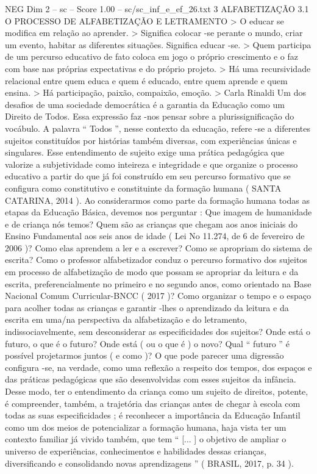 \begin{textsample}{NEG Dim 2 – sc – Score 1.00 – sc/sc\_inf\_e\_ef\_26.txt}  \label{ex:f2_neg_274}
3 ALFABETIZAÇÃO 3.1 O PROCESSO DE ALFABETIZAÇÃO E LETRAMENTO > O educar se modifica em relação ao aprender. > Significa colocar -se perante o mundo, criar um evento, habitar as diferentes situações.
Significa educar -se. > Quem participa de um percurso educativo de fato coloca em jogo o próprio crescimento e o faz com base nas próprias expectativas e do próprio projeto. > Há uma recursividade relacional entre quem educa e quem é educado, entre quem aprende e quem ensina. > Há participação, paixão, compaixão, emoção. > Carla Rinaldi Um dos desafios de uma sociedade democrática é a garantia da Educação como um Direito de Todos.
Essa expressão faz -nos pensar sobre a plurissignificação do vocábulo.
A palavra “ Todos ”, nesse contexto da educação, refere -se a diferentes sujeitos constituídos por histórias também diversas, com experiências únicas e singulares.
Esse entendimento de sujeito exige uma prática pedagógica que valorize a subjetividade como inteireza e integridade e que organize o processo educativo a partir do que já foi construído em seu percurso formativo que se configura como constitutivo e constituinte da formação humana ( SANTA CATARINA, 2014 ).
Ao considerarmos como parte da formação humana todas as etapas da Educação Básica, devemos nos perguntar : Que imagem de humanidade e de criança nós temos?
Quem são as crianças que chegam aos anos iniciais do Ensino Fundamental aos seis anos de idade ( Lei No 11.274, de 6 de fevereiro de 2006 )?
Como elas aprendem a ler e a escrever?
Como se apropriam do sistema de escrita?
Como o professor alfabetizador conduz o percurso formativo dos sujeitos em processo de alfabetização de modo que possam se apropriar da leitura e da escrita, preferencialmente no primeiro e no segundo anos, como orientado na Base Nacional Comum Curricular-BNCC ( 2017 )?
Como organizar o tempo e o espaço para acolher todas as crianças e garantir -lhes o aprendizado da leitura e da escrita em uma/na perspectiva da alfabetização e do letramento, indissociavelmente, sem desconsiderar as especificidades dos sujeitos?
Onde está o futuro, o que é o futuro?
Onde está ( ou o que é ) o novo?
Qual “ futuro ” é possível projetarmos juntos ( e como )?
O que pode parecer uma digressão configura -se, na verdade, como uma reflexão a respeito dos tempos, dos espaços e das práticas pedagógicas que são desenvolvidas com esses sujeitos da infância.
Desse modo, ter o entendimento da criança como um sujeito de direitos, potente, é compreender, também, a trajetória das crianças antes de chegar à escola com todas as suas especificidades ; é reconhecer a importância da Educação Infantil como um dos meios de potencializar a formação humana, haja vista ter um contexto familiar já vivido também, que tem “ [... ] o objetivo de ampliar o universo de experiências, conhecimentos e habilidades dessas crianças, diversificando e consolidando novas aprendizagens ” ( BRASIL, 2017, p. 34 ).

\end{textsample}
